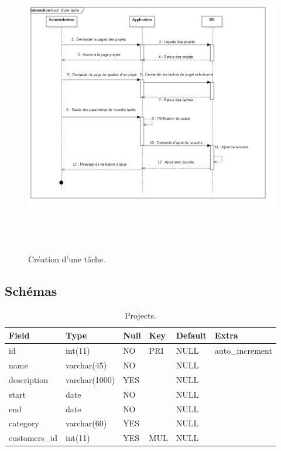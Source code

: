 \begin{figure}[H]
\center
\includegraphics[width=14cm,height=13cm]{./figures/seq/C.png}
\caption{Cr\'{e}ation d'une t\^{a}che.}
\end{figure}



\newpage

\subsection{Sch\'{e}mas}
\FloatBarrier

\begin{table}

\begin{tabular}{|l|l|l|l|l|l|}
\hline
Field         & Type          & Null & Key & Default & Extra            \\
\hline
id            & int(11)       & NO   & PRI & NULL    & auto\_increment  \\
\hline
name          & varchar(45)   & NO   &     & NULL    &                  \\
\hline
description   & varchar(1000) & YES  &     & NULL    &                  \\
\hline
start         & date          & NO   &     & NULL    &                  \\
\hline
end           & date          & NO   &     & NULL    &                  \\
\hline
category      & varchar(60)   & YES  &     & NULL    &                  \\
\hline
customers\_id & int(11)       & YES  & MUL & NULL    &                  \\
\hline
\end{tabular}
\centering
 \caption {Projects.}
\end{table}
\FloatBarrier

